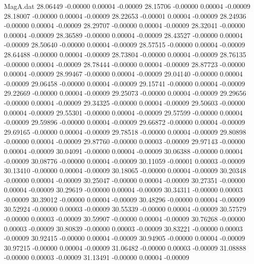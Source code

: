 \begin{filecontents}{MagA.dat}
  28.06449   -0.00000    0.00004   -0.00009
  28.15706   -0.00000    0.00004   -0.00009
  28.18007   -0.00000    0.00004   -0.00009
  28.22653   -0.00001    0.00004   -0.00009
  28.24936   -0.00000    0.00004   -0.00009
  28.29707   -0.00000    0.00004   -0.00009
  28.32041   -0.00000    0.00004   -0.00009
  28.36589   -0.00000    0.00004   -0.00009
  28.43527   -0.00000    0.00004   -0.00009
  28.50640   -0.00000    0.00004   -0.00009
  28.57515   -0.00000    0.00004   -0.00009
  28.64488   -0.00000    0.00004   -0.00009
  28.73804   -0.00000    0.00004   -0.00009
  28.76135   -0.00000    0.00004   -0.00009
  28.78444   -0.00000    0.00004   -0.00009
  28.87723   -0.00000    0.00004   -0.00009
  28.99467   -0.00000    0.00004   -0.00009
  29.04140   -0.00000    0.00004   -0.00009
  29.06458   -0.00000    0.00004   -0.00009
  29.15741   -0.00000    0.00004   -0.00009
  29.22669   -0.00000    0.00004   -0.00009
  29.25073   -0.00000    0.00004   -0.00009
  29.29656   -0.00000    0.00004   -0.00009
  29.34325   -0.00000    0.00004   -0.00009
  29.50603   -0.00000    0.00004   -0.00009
  29.55301   -0.00000    0.00004   -0.00009
  29.57599   -0.00000    0.00004   -0.00009
  29.59896   -0.00000    0.00004   -0.00009
  29.66872   -0.00000    0.00004   -0.00009
  29.69165   -0.00000    0.00004   -0.00009
  29.78518   -0.00000    0.00004   -0.00009
  29.80898   -0.00000    0.00004   -0.00009
  29.87760   -0.00000    0.00003   -0.00009
  29.97143   -0.00000    0.00004   -0.00009
  30.04091   -0.00000    0.00004   -0.00009
  30.06388   -0.00000    0.00004   -0.00009
  30.08776   -0.00000    0.00004   -0.00009
  30.11059   -0.00001    0.00003   -0.00009
  30.13410   -0.00000    0.00004   -0.00009
  30.18065   -0.00000    0.00004   -0.00009
  30.20348   -0.00000    0.00004   -0.00009
  30.25047   -0.00000    0.00004   -0.00009
  30.27351   -0.00000    0.00004   -0.00009
  30.29619   -0.00000    0.00004   -0.00009
  30.34311   -0.00000    0.00003   -0.00009
  30.39012   -0.00000    0.00004   -0.00009
  30.48296   -0.00000    0.00004   -0.00009
  30.52924   -0.00000    0.00003   -0.00009
  30.55339   -0.00000    0.00004   -0.00009
  30.57579   -0.00000    0.00003   -0.00009
  30.59907   -0.00000    0.00004   -0.00009
  30.76268   -0.00000    0.00003   -0.00009
  30.80839   -0.00000    0.00003   -0.00009
  30.83221   -0.00000    0.00003   -0.00009
  30.92415   -0.00000    0.00004   -0.00009
  30.94905   -0.00000    0.00004   -0.00009
  30.97215   -0.00000    0.00004   -0.00009
  31.06482   -0.00000    0.00003   -0.00009
  31.08888   -0.00000    0.00003   -0.00009
  31.13491   -0.00000    0.00004   -0.00009

\end{filecontents}
